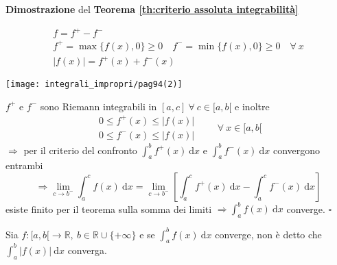 \begin{dembar}
	\textbf{Dimostrazione} del \textbf{Teorema \ref{th:criterio assoluta integrabilità}}
	
	\begin{gather*}
		f = f^+ - f^-
		\\
		f^+ = \max \{f(x), 0\} \geq 0 \quad f^- =\min \{f(x), 0\} \geq 0 \quad \forall \ x
		\\
		\left| f(x) \right| = f^+(x) + f^-(x)
	\end{gather*}
	\begin{center}
		\texttt{[image: integrali\_impropri/pag94(2)]}
		\label{fig:pag94}
	\end{center}

	$f^+$ e $f^-$ sono Riemann integrabili  in  $[a,c] \ \forall \ c \in [a,b[$ e inoltre
	\begin{equation*}
		\begin{array}{c}
			0 \leq f^+(x) \leq |f(x)|
			\\
			0 \leq f^-(x) \leq |f(x)|
		\end{array}
		\qquad \forall \ x \in [a,b[
	\end{equation*}
	$\Rightarrow$ per il criterio del confronto $\int_{a}^{b} f^+(x) \ \mathrm{d}x$ e $\int_{a}^{b} f^-(x) \ \mathrm{d}x$ convergono entrambi 
	\begin{equation*}
		\Rightarrow \lim_{c \rightarrow b^-} \int_{a}^{c} f(x) \ \mathrm{d}x = \lim_{c \rightarrow b^-} \left[ \int_{a}^{c}f^+(x) \ \mathrm{d}x - \int_{a}^{c}f^-(x) \ \mathrm{d}x \right]
	\end{equation*}
	esiste finito per il teorema sulla somma dei limiti $\Rightarrow \int_{a}^{b} f(x) \ \mathrm{d}x$ converge. $\square$
\end{dembar}


\begin{attbar}
	Sia $f: [a,b[ \rightarrow \mathbb{R}, \ b \in \mathbb{R} \cup \{+\infty\}$ e se $\int_{a}^{b} f(x) \ \mathrm{d}x$ converge, non è detto che $\int_{a}^{b} |f(x)| \ \mathrm{d}x$ converga.
\end{attbar}


